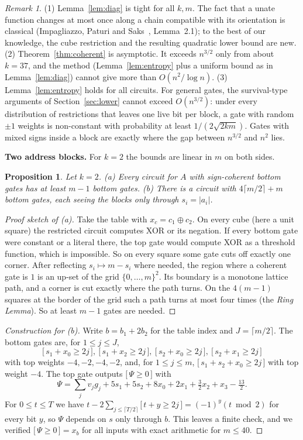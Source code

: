 \documentclass[11pt,letterpaper]{article}
\newtheorem{proposition}[theorem]{Proposition}
\theoremstyle{remark}
\newtheorem*{remark}{Remark}
\newcommand{\ind}[1]{\bigl[\,#1\,\bigr]}
\newcommand{\smalltitle}[1]{\textbf{\color{ink}#1}\quad}
\begin{document}
\begin{remark}
(1) Lemma~\ref{lem:diag} is tight for all $k,m$. The fact that a
unate function changes at most once along a chain compatible with its
orientation is classical (Impagliazzo, Paturi and Saks~\cite{IPS},
Lemma~2.1); to the best of our knowledge,
the cube restriction and the resulting quadratic lower bound are new. (2) Theorem~\ref{thm:coherent} is
asymptotic. It exceeds $n^{3/2}$ only from about $k=37$, and the method
(Lemma~\ref{lem:entropy} plus a uniform bound as in Lemma~\ref{lem:diag})
cannot give more than $O(n^2/\log n)$. (3) Lemma~\ref{lem:entropy} holds for
all circuits. For general gates, the survival-type arguments of
Section~\ref{sec:lower} cannot exceed $O(n^{3/2})$: under every
distribution of restrictions that leaves one live bit per block, a gate with
random $\pm1$ weights is non-constant with probability at least
$1/(2\sqrt{2km})$. Gates with mixed signs inside a block are exactly where
the gap between $n^{3/2}$ and $n^2$ lies.
\end{remark}

\smalltitle{Two address blocks.}
For $k=2$ the bounds are linear in $m$ on both sides.

\begin{proposition}\label{prop:k2}
Let $k=2$. (a) Every circuit for $A$ with sign-coherent bottom gates has at
least $m-1$ bottom gates. (b) There is a circuit with $4\lceil m/2\rceil+m$
bottom gates, each seeing the blocks only through $s_i=|a_i|$.
\end{proposition}
\begin{proof}[Proof sketch of (a)]
Take the table with $x_c=c_1\oplus c_2$. On every cube (here a unit square)
the restricted circuit computes XOR or its negation. If every bottom gate were
constant or a literal there, the top gate would compute XOR as a threshold
function, which is impossible. So on every square some gate cuts off exactly
one corner. After reflecting $s_i\mapsto m-s_i$ where needed, the region where
a coherent gate is $1$ is an up-set of the grid $\{0,\dots,m\}^2$. Its
boundary is a monotone lattice path, and a corner is cut exactly where the
path turns. On the $4(m-1)$ squares at the border of the grid such a path
turns at most four times (the \emph{Ring Lemma}). So at least $m-1$ gates are needed.
\end{proof}
\begin{proof}[Construction for (b)]
Write $b=b_1+2b_2$ for the table index and $J=\lceil m/2\rceil$. The bottom
gates are, for $1\le j\le J$,
\[
\ind{s_1+x_0\ge2j},\ \ind{s_1+x_2\ge2j},\ \ind{s_2+x_0\ge2j},\ \ind{s_2+x_1\ge2j}
\]
with top weights $-4,-2,-4,-2$, and, for $1\le j\le m$, $\ind{s_1+s_2+x_0\ge2j}$
with top weight $-4$. The top gate outputs $\ind{\Psi\ge0}$ with
\[
\Psi=\sum_j v_jg_j+5s_1+5s_2+8x_0+2x_1+\tfrac32x_2+x_3-\tfrac{13}2 .
\]
For $0\le t\le T$ we have $t-2\sum_{j\le\lceil T/2\rceil}\ind{t+y\ge2j}=(-1)^y(t\bmod2)$
for every bit $y$, so $\Psi$ depends on $s$ only through $b$. This leaves a
finite check, and we verified $\ind{\Psi\ge0}=x_b$ for all inputs with exact
arithmetic for $m\le40$.
\end{proof}
\end{document}
